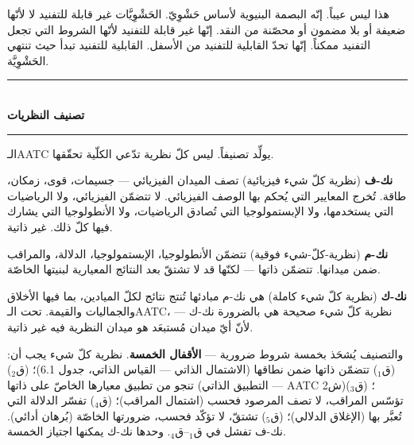 \documentclass[10pt, openany, oneside]{book}
\renewcommand{\normalsize}{\fontsize{10}{13}\selectfont}
\begin{document}
\vspace{0.8em}

\noindent هذا ليس عيباً. إنّه البصمة البنيوية لأساس حَشْوِيّ. الحَشْوِيَّات غير قابلة للتفنيد لا لأنّها ضعيفة أو بلا مضمون أو محصّنة من النقد. إنّها غير قابلة للتفنيد لأنّها الشروط التي تجعل التفنيد ممكناً. إنّها تحدّ القابلية للتفنيد من الأسفل. القابلية للتفنيد تبدأ حيث تنتهي الحَشْوِيَّة.

\vspace{1.5em}


\begin{center}
    \rule{0.3\textwidth}{0.4pt}\\[0.5em]
    {\normalsize\bfseries تصنيف النظريات}\\[0.3em]
    \rule{0.3\textwidth}{0.4pt}
\end{center}

\vspace{1em}

\noindent الـAATC يولِّد تصنيفاً. ليس كلّ نظرية تدّعي الكلّية تحقّقها.

\textbf{نك-ف} (نظرية كلّ شيء فيزيائية) تصف الميدان الفيزيائي --- جسيمات، قوى، زمكان، طاقة. تُخرج المعايير التي يُحكم بها الوصف الفيزيائي. لا تتضمّن الفيزيائي، ولا الرياضيات التي يستخدمها، ولا الإبستمولوجيا التي تُصادق الرياضيات، ولا الأنطولوجيا التي يشارك فيها كلّ ذلك. غير ذاتية.

\textbf{نك-م} (نظرية-كلّ-شيء فوقية) تتضمّن الأنطولوجيا، الإبستمولوجيا، الدلالة، والمراقب ضمن ميدانها. تتضمّن ذاتها --- لكنّها قد لا تشتقّ بعد النتائج المعيارية لبنيتها الخاصّة.

\textbf{نك-ك} (نظرية كلّ شيء كاملة) هي نك-م مبادئها تُنتج نتائج لكلّ الميادين، بما فيها الأخلاق والجماليات والقيمة. تحت الـAATC، نظرية كلّ شيء صحيحة هي بالضرورة نك-ك --- لأنّ أيّ ميدان مُستبعَد هو ميدان النظرية فيه غير ذاتية.

والتصنيف يُشحَذ بخمسة شروط ضرورية --- \textbf{الأقفال الخمسة}. نظرية كلّ شيء يجب أن: (ق$_1$) تتضمّن ذاتها ضمن نطاقها (الاشتمال الذاتي --- القياس الذاتي، جدول 6.1)؛ (ق$_2$) تنجو من تطبيق معيارها الخاصّ على ذاتها (التطبيق الذاتي --- AATC ش2)؛ (ق$_3$) تؤسّس المراقب، لا تصف المرصود فحسب (اشتمال المراقب)؛ (ق$_4$) تفسّر الدلالة التي تُعبَّر بها (الإغلاق الدلالي)؛ (ق$_5$) تشتقّ، لا تؤكّد فحسب، ضرورتها الخاصّة (بُرهان أدائي). نك-ف تفشل في ق$_1$--ق$_4$. وحدها نك-ك يمكنها اجتياز الخمسة.

\vspace{0.5em}
\end{document}
